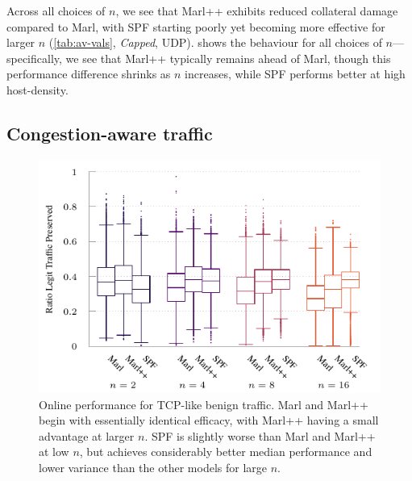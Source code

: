 \documentclass[conference, letterpaper, 10pt, times]{IEEEtran}
\begin{document}
Across all choices of $n$, we see that Marl++ exhibits reduced collateral damage compared to Marl, with SPF starting poorly yet becoming more effective for larger $n$ (\cref{tab:av-vals}, \emph{Capped}, UDP).
 shows the behaviour for all choices of $n$---specifically, we see that Marl++ typically remains ahead of Marl, though this performance difference shrinks as $n$ increases, while SPF performs better at high host-density.

\subsection{Congestion-aware traffic}
%	
\begin{figure}
	\centering
	\includegraphics[width=0.95\linewidth]{../plots/tcp-box}
	
	\caption{
		Online performance for TCP-like benign traffic.
		Marl and Marl++ begin with essentially identical efficacy, with Marl++ having a small advantage at larger $n$.
		SPF is slightly worse than Marl and Marl++ at low $n$, but achieves considerably better median performance and lower variance than the other models for large $n$.
		\label{fig:tcp-box}
	}
\end{figure}
\end{document}
